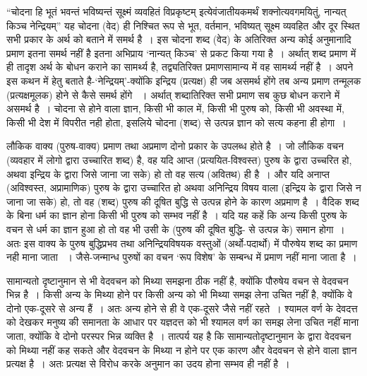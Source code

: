 “चोदना हि भूतं भवन्तं भविष्यन्तं सूक्ष्मं व्यवहितं विप्रकृष्टम् इत्येवंजातीयकमर्थं शक्नोत्य\-वगमयितुं, नान्यत् किञ्च नेन्द्रियम्” यह चोदना (वेद) ही निश्चित रूप से भूत, वर्तमान, भविष्यत् सूक्ष्म व्यवहित और दूर स्थित सभी प्रकार के अर्थ को बताने में समर्थ है~। इस चोदना शब्द (वेद) के अतिरिक्त अन्य कोई अनुमानादि प्रमाण इतना समर्थ नहीं है इतना अभिप्राय ‘नान्यत् किञ्च' से प्रकट किया गया है~। अर्थात् शब्द प्रमाण में ही तादृश अर्थ के बोधन कराने का सामर्थ्य है, तद्व्यतिरिक्त प्रमाणसामान्य में वह सामर्थ्य नहीं है~। अपने इस कथन में हेतु बताते है-‘नेन्द्रियम्'-क्योंकि इन्द्रिय (प्रत्यक्ष) ही जब असमर्थ होंगे तब अन्य प्रमाण तन्मूलक (प्रत्यक्षमूलक) होने से कैसे समर्थ होंगे ~। अर्थात् शब्दातिरिक्त सभी प्रमाण सब कुछ बोधन कराने में असमर्थ है~। चोदना से होने वाला ज्ञान, किसी भी काल में, किसी भी पुरुष को, किसी भी अवस्था में, किसी भी देश में विपरीत नही होता, इसलिये चोदना (शब्द) से उत्पन्न ज्ञान को सत्य कहना ही होगा~। 

लौकिक वाक्य (पुरुष-वाक्य) प्रमाण तथा अप्रमाण दोनो प्रकार के उपलब्ध होते है~। जो लौकिक वचन (व्यवहार में लोगो द्वारा उच्चारित शब्द) है, वह यदि आप्त (प्रत्ययित-विश्वस्त) पुरुष के द्वारा उच्चरित हो, अथवा इन्द्रिय के द्वारा जिसे जाना जा सके) हो तो वह सत्य (अवितथ) ही है~। और यदि अनाप्त (अविश्वस्त, अप्रामाणिक) पुरुष के द्वारा उच्चारित हो अथवा अनिन्द्रिय विषय वाला (इन्द्रिय के द्वारा जिसे न जाना जा सके) हो, तो वह (शब्द) पुरुष की दूषित बुद्धि से उत्पन्न होने के कारण अप्रमाण है~। वैदिक शब्द के बिना धर्म का ज्ञान होना किसी भी पुरुष को सम्भव नहीं है~। यदि यह कहें कि अन्य किसी पुरुष के वचन से धर्म का ज्ञान हुआ हो तो वह भी उसी के (पुरुष की दूषित बुद्धि- से उत्पन्न के) समान होगा~। अतः इस वाक्य के पुरुष बुद्धिप्रभव तथा अनिन्द्रियविषयक वस्तुओं (अर्थो-पदार्थो) में पौरुषेय शब्द का प्रमाण नही माना जाता ~। जैसे-जन्मान्ध पुरुषों का वचन ‘रूप विशेष' के सम्बन्ध में प्रमाण नहीं माना जाता है~।

सामान्यतो दृष्टानुमान से भी वेदवचन को मिथ्या समझना ठीक नहीं है, क्योंकि पौरुषेय वचन से वेदवचन भिन्न है~। किसी अन्य के मिथ्या होने पर किसी अन्य को भी मिथ्या समझ लेना उचित नहीं है, क्योंकि वे दोनो एक-दूसरे से अन्य हैं~। अतः अन्य होने से ही वे एक-दूसरे जैसे नहीं रहते~। श्यामल वर्ण के देवदत्त को देखकर मनुष्य की समानता के आधार पर यज्ञदत्त को भी श्यामल वर्ण का समझ लेना उचित नहीं माना जाता, क्योंकि वे दोनो परस्पर भिन्न व्यक्ति है~। तात्पर्य यह है कि सामान्यतोदृष्टानुमान के द्वारा वेदवचन को मिथ्या नहीं कह सकते और वेदवचन के मिथ्या न होने पर एक कारण और वेदवचन से होने वाला ज्ञान प्रत्यक्ष है~। अतः प्रत्यक्ष से विरोध करके अनुमान का उदय होना सम्भव ही नहीं है~।

